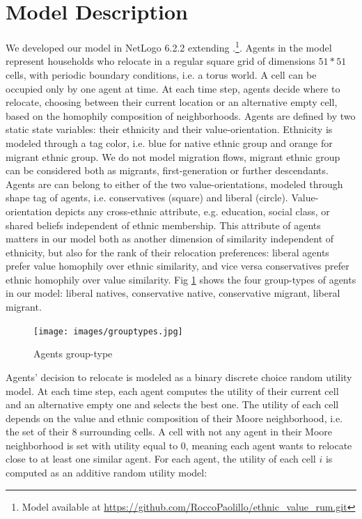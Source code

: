\documentclass[
]{article}
\begin{document}
\hypertarget{model-description}{%
\section{Model Description}\label{model-description}}

We developed our model in NetLogo 6.2.2 \citep{wilenskynl} extending
\cite{paolillo2018}.\footnote{Model available at \url{https://github.com/RoccoPaolillo/ethnic_value_rum.git}}. Agents in the model represent households who relocate in a regular square grid of dimensions $51*51$ cells, with periodic boundary conditions, i.e. a torus world. A cell can be occupied only by one agent at time. At each time step, agents decide where to relocate, choosing between their current location or an alternative empty cell, based on the homophily composition of neighborhoods. Agents are defined by two static state variables: their ethnicity and their value-orientation. Ethnicity is modeled through a tag color, i.e. blue for native ethnic group and orange for migrant ethnic group. We do not model migration flows, migrant ethnic group can be considered both as migrants, first-generation or further descendants. Agents are can belong to either of the two value-orientations, modeled through shape tag of agents, i.e. conservatives (square) and liberal (circle). Value-orientation depicts any cross-ethnic attribute, e.g. education, social class, or shared beliefs independent of ethnic membership. This attribute of agents matters in our model both as another dimension of similarity independent of ethnicity, but also for the rank of their relocation preferences: liberal agents prefer value homophily over ethnic similarity, and vice versa conservatives prefer ethnic homophily over value similarity. Fig \ref{fig:grp} shows the four group-types of agents in our model: liberal natives, conservative native, conservative migrant, liberal migrant.

\begin{figure}[H]
    \centering
    \texttt{[image: images/grouptypes.jpg]}
    \caption{Agents group-type}
    \label{fig:grp}
\end{figure}

Agents' decision to relocate is modeled as a binary discrete choice random utility model. At each time step, each agent computes the utility of their current cell and an alternative empty one and selects the best one. The utility of each cell depends on the value and ethnic composition of their Moore neighborhood, i.e. the set of their 8 surrounding cells. A cell with not any agent in their Moore neighborhood is set with utility equal to 0, meaning each agent wants to relocate close to at least one similar agent. For each agent, the utility of each cell $i$ is computed as an additive random utility model:
\end{document}
